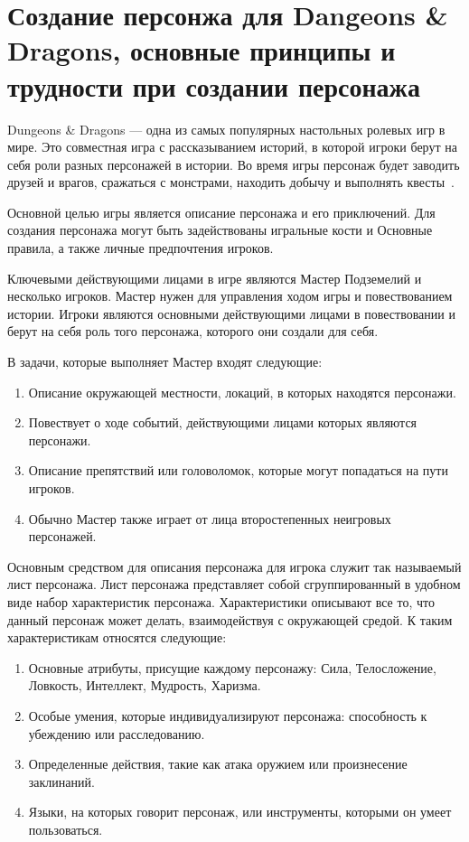 \chapter{Создание персонжа для Dangeons \& Dragons, основные принципы и трудности при создании персонажа}

Dungeons \& Dragons --- одна из самых популярных настольных ролевых игр в мире. Это совместная игра с рассказыванием историй, в которой игроки берут на себя роли разных персонажей в истории. Во время игры персонаж будет заводить друзей и врагов, сражаться с монстрами, находить добычу и выполнять квесты~\cite{explorednd,DandD,wiki}.

Основной целью игры является описание персонажа и его приключений. Для создания персонажа могут быть задействованы игральные кости и Основные правила, а также личные предпочтения игроков.

Ключевыми действующими лицами в игре являются Мастер Подземелий и несколько игроков. Мастер нужен для управления ходом игры и повествованием истории. Игроки являются основными действующими лицами в повествовании и берут на себя роль того персонажа, которого они создали для себя.

В задачи, которые выполняет Мастер входят следующие:

\begin{enumerate}
    \item Описание окружающей местности, локаций, в которых находятся персонажи.
    \item Повествует о ходе событий, действующими лицами которых являются персонажи.
    \item Описание препятствий или головоломок, которые могут попадаться на пути игроков.
    \item Обычно Мастер также играет от лица второстепенных неигровых персонажей.
\end{enumerate}

Основным средством для описания персонажа для игрока служит так называемый лист персонажа. Лист персонажа представляет собой сгруппированный в удобном виде набор характеристик персонажа. Характеристики описывают все то, что данный персонаж может делать, взаимодействуя с окружающей средой. К таким характеристикам относятся следующие:

\begin{enumerate}
    \item Основные атрибуты, присущие каждому персонажу: Сила, Телосложение, Ловкость, Интеллект, Мудрость, Харизма.
    \item Особые умения, которые индивидуализируют персонажа: способность к убеждению или расследованию.
    \item Определенные действия, такие как атака оружием или произнесение заклинаний.
    \item Языки, на которых говорит персонаж, или инструменты, которыми он умеет пользоваться.
\end{enumerate}

